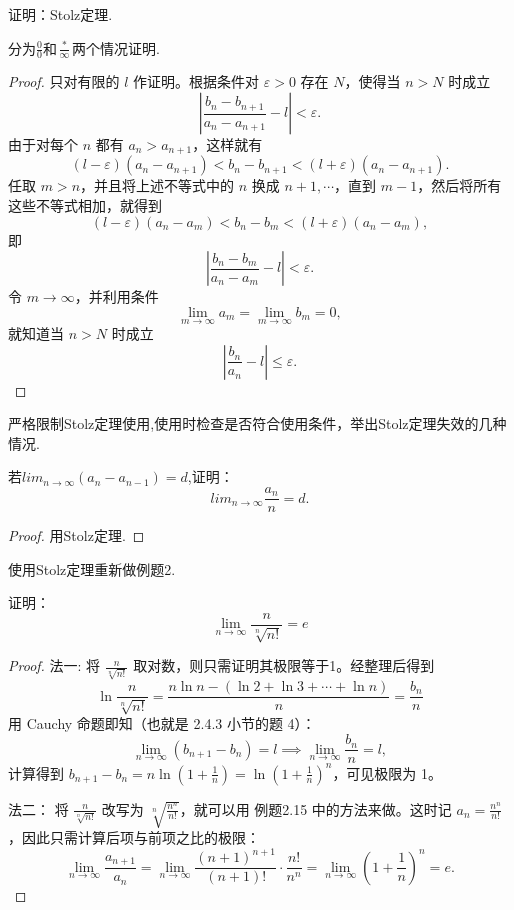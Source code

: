 \documentclass[lang=cn,12pt]{elegantbook}
\begin{document}
\begin{example}
    证明：Stolz定理.
\end{example}
\begin{note}
    分为$\frac{0}{0}$和$\frac{*}{\infty}$两个情况证明.
\end{note}
\begin{proof}
    只对有限的 \( l \) 作证明。根据条件对 \(\varepsilon > 0\) 存在 \( N \)，使得当 \( n > N \) 时成立
\[
\left| \frac{b_n - b_{n+1}}{a_n - a_{n+1}} - l \right| < \varepsilon.
\]
由于对每个 \( n \) 都有 \( a_n > a_{n+1} \)，这样就有
\[
(l - \varepsilon)(a_n - a_{n+1}) < b_n - b_{n+1} < (l + \varepsilon)(a_n - a_{n+1}).
\]
任取 \( m > n \)，并且将上述不等式中的 \( n \) 换成 \( n + 1, \cdots \)，直到 \( m - 1 \)，然后将所有这些不等式相加，就得到
\[
(l - \varepsilon)(a_n - a_m) < b_n - b_m < (l + \varepsilon)(a_n - a_m),
\]
即
\[
\left| \frac{b_n - b_m}{a_n - a_m} - l \right| < \varepsilon.
\]
令 \( m \to \infty \)，并利用条件 
\[
\lim_{m \to \infty} a_m = \lim_{m \to \infty} b_m = 0,
\]
就知道当 \( n > N \) 时成立
\[
\left| \frac{b_n}{a_n} - l \right| \leq \varepsilon.
\]
\end{proof}

\begin{remark}
     严格限制Stolz定理使用,使用时检查是否符合使用条件，举出Stolz定理失效的几种情况.
\end{remark}

\begin{example}
    若$lim_{n \to \infty} (a_n-a_{n-1})= d$,证明：\[
    lim_{n \to \infty} \frac{a_n}{n} = d.
    \]
\end{example}
\begin{proof}
    用Stolz定理.
\end{proof}

\begin{example}
    使用Stolz定理重新做例题2.
\end{example}

\begin{example}
    证明：\[
    \lim_{n \to \infty} \frac{n}{\sqrt[n]{n!}} = e
    \]
\end{example}
\begin{proof}
    法一: 将 \(\frac{n}{\sqrt[n]{n!}}\) 取对数，则只需证明其极限等于1。经整理后得到
\[
\ln \frac{n}{\sqrt[n]{n!}} = \frac{n \ln n - (\ln 2 + \ln 3 + \cdots + \ln n)}{n} = \frac{b_n}{n}
\]
用 Cauchy 命题即知（也就是 2.4.3 小节的题 4）：
\[
\lim_{n \to \infty} (b_{n+1} - b_n) = l \implies \lim_{n \to \infty} \frac{b_n}{n} = l,
\]
计算得到 \(b_{n+1} - b_n = n \ln \left( 1 + \frac{1}{n} \right) = \ln \left( 1 + \frac{1}{n} \right)^n\)，可见极限为 1。

\bigskip

法二： 将 \(\frac{n}{\sqrt[n]{n!}}\) 改写为 \(\sqrt[n]{\frac{n^n}{n!}}\)，就可以用 例题2.15 中的方法来做。这时记 \(a_n = \frac{n^n}{n!}\)，因此只需计算后项与前项之比的极限：
\[
\lim_{n \to \infty} \frac{a_{n+1}}{a_n} = \lim_{n \to \infty} \frac{(n+1)^{n+1}}{(n+1)!} \cdot \frac{n!}{n^n} = \lim_{n \to \infty} \left( 1 + \frac{1}{n} \right)^n = e.
\]
\end{proof}
\end{document}
